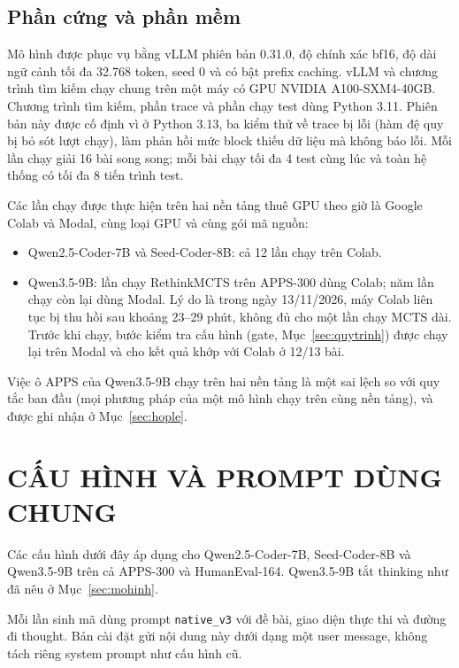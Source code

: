 \subsection{Phần cứng và phần mềm}

Mô hình được phục vụ bằng vLLM \cite{kwon2023vllm} phiên bản 0.31.0, độ chính xác bf16, độ dài ngữ cảnh tối đa 32.768 token, seed 0 và có bật prefix caching. vLLM và chương trình tìm kiếm chạy chung trên một máy có GPU NVIDIA A100-SXM4-40GB. Chương trình tìm kiếm, phần trace và phần chạy test dùng Python 3.11. Phiên bản này được cố định vì ở Python 3.13, ba kiểm thử về trace bị lỗi (hàm đệ quy bị bỏ sót lượt chạy), làm phản hồi mức block thiếu dữ liệu mà không báo lỗi. Mỗi lần chạy giải 16 bài song song; mỗi bài chạy tối đa 4 test cùng lúc và toàn hệ thống có tối đa 8 tiến trình test.

Các lần chạy được thực hiện trên hai nền tảng thuê GPU theo giờ là Google Colab và Modal, cùng loại GPU và cùng gói mã nguồn:

\begin{itemize}
  \item Qwen2.5-Coder-7B và Seed-Coder-8B: cả 12 lần chạy trên Colab.
  \item Qwen3.5-9B: lần chạy RethinkMCTS trên APPS-300 dùng Colab; năm lần chạy còn lại dùng Modal. Lý do là trong ngày 13/11/2026, máy Colab liên tục bị thu hồi sau khoảng 23--29 phút, không đủ cho một lần chạy MCTS dài. Trước khi chạy, bước kiểm tra cấu hình (gate, Mục~\ref{sec:quytrinh}) được chạy lại trên Modal và cho kết quả khớp với Colab ở 12/13 bài.
\end{itemize}

Việc ô APPS của Qwen3.5-9B chạy trên hai nền tảng là một sai lệch so với quy tắc ban đầu (mọi phương pháp của một mô hình chạy trên cùng nền tảng), và được ghi nhận ở Mục~\ref{sec:hople}.

\section{CẤU HÌNH VÀ PROMPT DÙNG CHUNG}
\label{sec:cauhinh}
Các cấu hình dưới đây áp dụng cho Qwen2.5-Coder-7B, Seed-Coder-8B và Qwen3.5-9B trên cả APPS-300 và HumanEval-164. Qwen3.5-9B tắt thinking như đã nêu ở Mục~\ref{sec:mohinh}.

Mỗi lần sinh mã dùng prompt \texttt{native\_v3} với đề bài, giao diện thực thi và đường đi thought. Bản cài đặt gửi nội dung này dưới dạng một user message, không tách riêng system prompt như cấu hình cũ.

